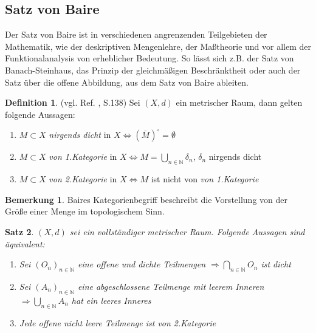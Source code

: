 \documentclass[10pt,a4paper]{article}
\theoremstyle{plain}
\newtheorem{satz}{Satz}[section]
\newenvironment{sa}{\begin{shaded}\begin{satz}}{\end{satz}\end{shaded}}
\theoremstyle{definition}
\newtheorem{definition}[satz]{Definition}
\newenvironment{dfi}{\begin{shaded}\begin{definition}}{\end{definition}\end{shaded}}
\theoremstyle{nonumberplain}
\newtheorem{bemerkung}{Bemerkung}
\newenvironment{bem}{\begin{bemerkung}}{\end{bemerkung}}
\newcommand{\N}{\mathbb{N}}
\begin{document}
\subsection{Satz von Baire}
Der Satz von Baire ist in verschiedenen angrenzenden Teilgebieten der Mathematik, wie der deskriptiven Mengenlehre, der Maßtheorie und vor allem der Funktionalanalysis von erheblicher Bedeutung. So lässt sich z.B. der Satz von Banach-Steinhaus, das Prinzip der gleichmäßigen Beschränktheit oder auch der Satz über die offene Abbildung, aus dem Satz von Baire ableiten.
\begin{dfi}
(vgl. Ref. \cite{Werner}, S.138) Sei $(X,d)$ ein metrischer Raum, dann gelten folgende Aussagen:
\begin{enumerate}[label=(\roman*)]
\item $M \subset X$ \textit{nirgends dicht} in $X \Leftrightarrow (\bar{M})^\circ = \emptyset$
\item $M \subset X$ \textit{von 1.Kategorie} in $X \Leftrightarrow M = \bigcup\limits_{n \in \N}{\delta_n}$, $\delta_n$ nirgends dicht
\item $M \subset X$ \textit{von 2.Kategorie} in $X \Leftrightarrow M$ ist nicht von \textit{von 1.Kategorie}
\end{enumerate}
\end{dfi}
\begin{bem}
Baires Kategorienbegriff beschreibt die Vorstellung von der Größe einer Menge im topologischem Sinn.
\end{bem}
\begin{sa}
\label{sa_baire}
$(X,d)$ sei ein vollständiger metrischer Raum. Folgende Aussagen sind äquivalent:
\begin{enumerate}[label=(\roman*)]
\item Sei ${(O_n)}_{n \in \N}$ eine offene und dichte Teilmengen $\Rightarrow \bigcap\limits_{n \in \N}{O_n}$ ist dicht
\item Sei $(A_n)_{n \in \N}$ eine abgeschlossene Teilmenge mit leerem Inneren $\Rightarrow \bigcup\limits_{n \in \N}{A_n}$ hat ein leeres Inneres
\item Jede offene nicht leere Teilmenge  ist von 2.Kategorie
\end{enumerate}
\end{sa}
\end{document}
